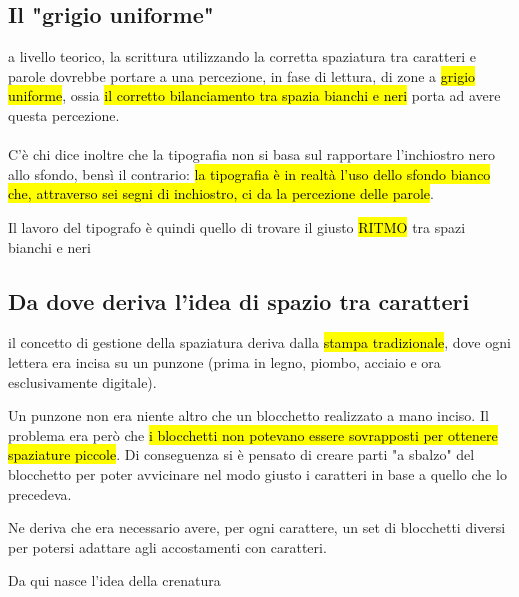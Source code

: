 \subsection{Il "grigio uniforme"}
a livello teorico, la scrittura utilizzando la corretta spaziatura tra caratteri e parole dovrebbe portare a una percezione, in fase di lettura, di zone a \hl{grigio uniforme}, ossia \hl{il corretto bilanciamento tra spazia bianchi e neri} porta ad avere questa percezione.
\\\\
C'è chi dice inoltre che la tipografia non si basa sul rapportare l'inchiostro nero allo sfondo, bensì il contrario: \hl{la tipografia è in realtà l'uso dello sfondo bianco che, attraverso sei segni di inchiostro, ci da la percezione delle parole}.

Il lavoro del tipografo è quindi quello di trovare il giusto \hl{RITMO} tra spazi bianchi e neri

\subsection{Da dove deriva l'idea di spazio tra caratteri}
il concetto di gestione della spaziatura deriva dalla \hl{stampa tradizionale}, dove ogni lettera era incisa su un punzone (prima in legno, piombo, acciaio e ora esclusivamente digitale).

Un punzone non era niente altro che un blocchetto realizzato a mano inciso. Il problema era però che \hl{i blocchetti non potevano essere sovrapposti per ottenere spaziature piccole}. Di conseguenza si è pensato di creare parti "a sbalzo" del blocchetto per poter avvicinare nel modo giusto i caratteri in base a quello che lo precedeva.

Ne deriva che era necessario avere, per ogni carattere, un set di blocchetti diversi per potersi adattare agli accostamenti con caratteri.

Da qui nasce l'idea della crenatura

        


